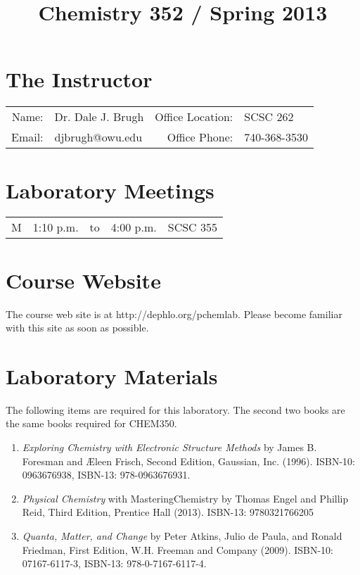 \documentclass[letterpaper,oneside,onecolumn,11pt,article]{memoir}
\title{Chemistry 352 / Spring 2013}
\date{}
\author{}
\begin{document}
\maketitle
\thispagestyle{courseinformationtitle}

\section{The Instructor}
\begin{tabular}{rl|rl}
Name: & Dr. Dale J. Brugh & Office Location: & SCSC 262 \\
Email: & djbrugh@owu.edu & Office Phone: & 740-368-3530 \\
\end{tabular}

\section{Laboratory Meetings}
\begin{tabular}{crcrl}
M & 1:10 p.m. & to & 4:00 p.m. & SCSC 355 \\
\end{tabular}

\section{Course Website}
The course web site is at http://dephlo.org/pchemlab. Please become familiar with this site as soon as possible.

\section{Laboratory Materials}
The following items are required for this laboratory. The second two books are the same books required for CHEM350. 
\begin{enumerate}
\item \textit{Exploring Chemistry with Electronic Structure Methods} by James B. Foresman and \AE leen Frisch, Second Edition, Gaussian, Inc. (1996). ISBN-10: 0963676938, ISBN-13: 978-0963676931.
\item \emph{Physical Chemistry} with MasteringChemistry by Thomas Engel and Phillip Reid, Third Edition, Prentice Hall (2013).  ISBN-13: 9780321766205
\item \emph{Quanta, Matter, and Change} by Peter Atkins, Julio de Paula, and Ronald Friedman, First Edition, W.H. Freeman and Company (2009). ISBN-10: 07167-6117-3, ISBN-13: 978-0-7167-6117-4.
\end{enumerate}
\end{document}
